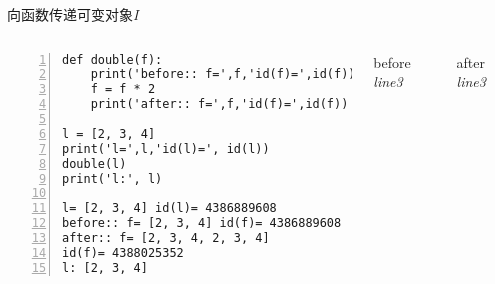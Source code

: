 \documentclass{beamer}
\begin{document}
\begin{frame}[fragile]{向函数传递可变对象\textit{I}}
\begin{columns}
\begin{Verbatim}[numbers=left,frame=single,rulecolor=\color{red}]
def double(f):
    print('before:: f=',f,'id(f)=',id(f))
    f = f * 2
    print('after:: f=',f,'id(f)=',id(f))

l = [2, 3, 4]
print('l=',l,'id(l)=', id(l))
double(l)
print('l:', l)

l= [2, 3, 4] id(l)= 4386889608
before:: f= [2, 3, 4] id(f)= 4386889608
after:: f= [2, 3, 4, 2, 3, 4] 
id(f)= 4388025352
l: [2, 3, 4]
\end{Verbatim}
\begin{block}{before \textit{line3}}
\end{block}
\begin{block}{after \textit{line3}}
\end{block}

\end{columns}
\end{frame}
\end{document}
